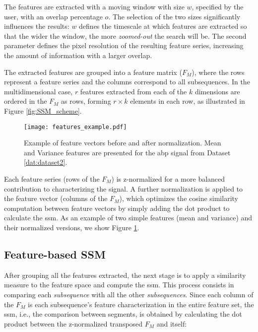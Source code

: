 The features are extracted with a moving window with size $w$, specified by the user, with an overlap percentage $o$. The selection of the two sizes significantly influences the results: $w$ defines the timescale at which features are extracted so that the wider the window, the more \textit{zoomed-out} the search will be. The second parameter defines the pixel resolution of the resulting feature series, increasing the amount of information with a larger overlap.

The extracted features are grouped into a feature matrix ($F_{M}$), where the rows represent a feature series and the columns correspond to all subsequences. In the multidimensional case, $r$ features extracted from each of the $k$ dimensions are ordered in the $F_M$ as rows, forming $r \times k$ elements in each row, as illustrated in Figure \ref{fig:SSM_scheme}.

\begin{figure}
\texttt{[image: features\_example.pdf]}
\caption{Example of feature vectors before and after normalization. Mean and Variance features are presented for the \gls{abp} signal from Dataset \ref{dat:dataset2}.}
\label{fig:features_normalized}
\end{figure}

Each feature series (rows of the $F_M$) is z-normalized for a more balanced contribution to characterizing the signal. A further normalization is applied to the feature vector (columns of the $F_M$), which optimizes the cosine similarity computation between feature vectors by simply adding the dot product to calculate the \gls{ssm}. As an example of two simple features (mean and variance) and their normalized versions, we show Figure \ref{fig:features_normalized}.

\subsection{Feature-based SSM}
\label{sec:the_ssm}

After grouping all the features extracted, the next stage is to apply a similarity measure to the feature space and compute the \gls{ssm}. This process consists in comparing each \textit{subsequence} with all the other \textit{subsequences}. Since each column of the $F_M$ is each subsequence's feature characterization in the entire feature set, the \gls{ssm}, i.e., the comparison between segments, is obtained by calculating the dot product between the z-normalized transposed $F_{M}$ and itself:

